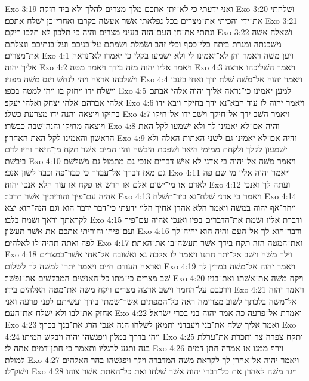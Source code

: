 Exo 3:19  ואני ידעתי כי לא־יתן אתכם מלך מצרים להלך ולא ביד חזקה׃
Exo 3:20  ושׁלחתי את־ידי והכיתי את־מצרים בכל נפלאתי אשׁר אעשׂה בקרבו ואחרי־כן ישׁלח אתכם׃
Exo 3:21  ונתתי את־חן העם־הזה בעיני מצרים והיה כי תלכון לא תלכו ריקם׃
Exo 3:22  ושׁאלה אשׁה משׁכנתה ומגרת ביתה כלי־כסף וכלי זהב ושׂמלת ושׂמתם על־בניכם ועל־בנתיכם ונצלתם את־מצרים׃
Exo 4:1  ויען משׁה ויאמר והן לא־יאמינו לי ולא ישׁמעו בקלי כי יאמרו לא־נראה אליך יהוה׃
Exo 4:2  ויאמר אליו יהוה מזה בידך ויאמר מטה׃
Exo 4:3  ויאמר השׁליכהו ארצה וישׁלכהו ארצה ויהי לנחשׁ וינס משׁה מפניו׃
Exo 4:4  ויאמר יהוה אל־משׁה שׁלח ידך ואחז בזנבו וישׁלח ידו ויחזק בו ויהי למטה בכפו׃
Exo 4:5  למען יאמינו כי־נראה אליך יהוה אלהי אבתם אלהי אברהם אלהי יצחק ואלהי יעקב׃
Exo 4:6  ויאמר יהוה לו עוד הבא־נא ידך בחיקך ויבא ידו בחיקו ויוצאה והנה ידו מצרעת כשׁלג׃
Exo 4:7  ויאמר השׁב ידך אל־חיקך וישׁב ידו אל־חיקו ויוצאה מחיקו והנה־שׁבה כבשׂרו׃
Exo 4:8  והיה אם־לא יאמינו לך ולא ישׁמעו לקל האת הראשׁון והאמינו לקל האת האחרון׃
Exo 4:9  והיה אם־לא יאמינו גם לשׁני האתות האלה ולא ישׁמעון לקלך ולקחת ממימי היאר ושׁפכת היבשׁה והיו המים אשׁר תקח מן־היאר והיו לדם ביבשׁת׃
Exo 4:10  ויאמר משׁה אל־יהוה בי אדני לא אישׁ דברים אנכי גם מתמול גם משׁלשׁם גם מאז דברך אל־עבדך כי כבד־פה וכבד לשׁון אנכי׃
Exo 4:11  ויאמר יהוה אליו מי שׂם פה לאדם או מי־ישׂום אלם או חרשׁ או פקח או עור הלא אנכי יהוה׃
Exo 4:12  ועתה לך ואנכי אהיה עם־פיך והוריתיך אשׁר תדבר׃
Exo 4:13  ויאמר בי אדני שׁלח־נא ביד־תשׁלח׃
Exo 4:14  ויחר־אף יהוה במשׁה ויאמר הלא אהרן אחיך הלוי ידעתי כי־דבר ידבר הוא וגם הנה־הוא יצא לקראתך וראך ושׂמח בלבו׃
Exo 4:15  ודברת אליו ושׂמת את־הדברים בפיו ואנכי אהיה עם־פיך ועם־פיהו והוריתי אתכם את אשׁר תעשׂון׃
Exo 4:16  ודבר־הוא לך אל־העם והיה הוא יהיה־לך לפה ואתה תהיה־לו לאלהים׃
Exo 4:17  ואת־המטה הזה תקח בידך אשׁר תעשׂה־בו את־האתת׃
Exo 4:18  וילך משׁה וישׁב אל־יתר חתנו ויאמר לו אלכה נא ואשׁובה אל־אחי אשׁר־במצרים ואראה העודם חיים ויאמר יתרו למשׁה לך לשׁלום׃
Exo 4:19  ויאמר יהוה אל־משׁה במדין לך שׁב מצרים כי־מתו כל־האנשׁים המבקשׁים את־נפשׁך׃
Exo 4:20  ויקח משׁה את־אשׁתו ואת־בניו וירכבם על־החמר וישׁב ארצה מצרים ויקח משׁה את־מטה האלהים בידו׃
Exo 4:21  ויאמר יהוה אל־משׁה בלכתך לשׁוב מצרימה ראה כל־המפתים אשׁר־שׂמתי בידך ועשׂיתם לפני פרעה ואני אחזק את־לבו ולא ישׁלח את־העם׃
Exo 4:22  ואמרת אל־פרעה כה אמר יהוה בני בכרי ישׂראל׃
Exo 4:23  ואמר אליך שׁלח את־בני ויעבדני ותמאן לשׁלחו הנה אנכי הרג את־בנך בכרך׃
Exo 4:24  ויהי בדרך במלון ויפגשׁהו יהוה ויבקשׁ המיתו׃
Exo 4:25  ותקח צפרה צר ותכרת את־ערלת בנה ותגע לרגליו ותאמר כי חתן־דמים אתה לי׃
Exo 4:26  וירף ממנו אז אמרה חתן דמים למולת׃
Exo 4:27  ויאמר יהוה אל־אהרן לך לקראת משׁה המדברה וילך ויפגשׁהו בהר האלהים וישׁק־לו׃
Exo 4:28  ויגד משׁה לאהרן את כל־דברי יהוה אשׁר שׁלחו ואת כל־האתת אשׁר צוהו׃
